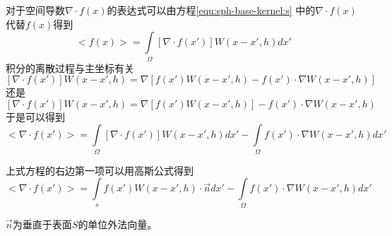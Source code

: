 对于空间导数$\nabla{}\cdot{}f(x)$的表达式可以由方程\ref{equ:sph-base-kernel:s}
中的$\nabla{}\cdot{}f(x)$代替$f(x)$得到
\begin{equation}
\label{equ:shp-function-dis}
<f(x)> = \int\limits_\Omega{}\left[{}\nabla{}\cdot{}f(x')\right]{}W(x-x',h)dx'
\end{equation}
积分的离散过程与主坐标有关
\begin{equation}
\left[{}\nabla{}\cdot{}f(x')\right]{}W(x-x',h) = 
\nabla\left[{}f(x')W(x-x',h)-f(x')\cdot\nabla{}W(x-x',h)\right]
\end{equation}
还是
\begin{equation}
\left[{}\nabla{}\cdot{}f(x')\right]{}W(x-x',h) = 
\nabla\left[{}f(x')W(x-x',h)\right]{}-f(x')\cdot\nabla{}W(x-x',h)
\end{equation}
于是可以得到
\begin{equation}
<\nabla{}\cdot{}f(x')> 
= \int\limits_\Omega{}\left[{}\nabla{}\cdot{}f(x')\right]{}W(x-x',h)dx' 
- \int\limits_\Omega{}f(x')\cdot\nabla{}W(x-x',h)dx'
\end{equation}

上式方程的右边第一项可以用高斯公式得到
\begin{equation}
\label{equ:sph-dis-int-guass}
<\nabla{}\cdot{}f(x')> 
= \int\limits_s f(x') W(x-x',h)\cdot\vec{n}dx'
- \int\limits_\Omega{}f(x')\cdot\nabla{}W(x-x',h)dx'
\end{equation}

$\vec{n}$为垂直于表面$S$的单位外法向量。

